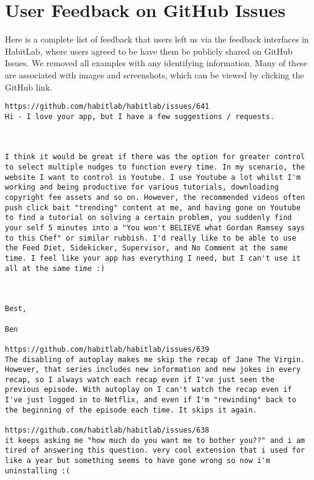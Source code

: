 \chapter{User Feedback on GitHub Issues}
\label{ch:github}

Here is a complete list of feedback that users left us via the feedback interfaces in HabitLab, where users agreed to be have them be publicly shared on GitHub Issues. We removed all examples with any identifying information. Many of these are associated with images and screenshots, which can be viewed by clicking the GitHub link.

\begin{lstlisting}[breaklines]
https://github.com/habitlab/habitlab/issues/641
Hi - I love your app, but I have a few suggestions / requests.



I think it would be great if there was the option for greater control to select multiple nudges to function every time. In my scenario, the website I want to control is Youtube. I use Youtube a lot whilst I'm working and being productive for various tutorials, downloading copyright fee assets and so on. However, the recommended videos often push click bait "trending" content at me, and having gone on Youtube to find a tutorial on solving a certain problem, you suddenly find your self 5 minutes into a "You won't BELIEVE what Gordan Ramsey says to this Chef" or similar rubbish. I'd really like to be able to use the Feed Diet, Sidekicker, Supervisor, and No Comment at the same time. I feel like your app has everything I need, but I can't use it all at the same time :) 



Best,

Ben

https://github.com/habitlab/habitlab/issues/639
The disabling of autoplay makes me skip the recap of Jane The Virgin. However, that series includes new information and new jokes in every recap, so I always watch each recap even if I've just seen the previous episode. With autoplay on I can't watch the recap even if I've just logged in to Netflix, and even if I'm "rewinding" back to the beginning of the episode each time. It skips it again.

https://github.com/habitlab/habitlab/issues/638
it keeps asking me "how much do you want me to bother you??" and i am tired of answering this question. very cool extension that i used for like a year but something seems to have gone wrong so now i'm uninstalling :(


\end{lstlisting}
